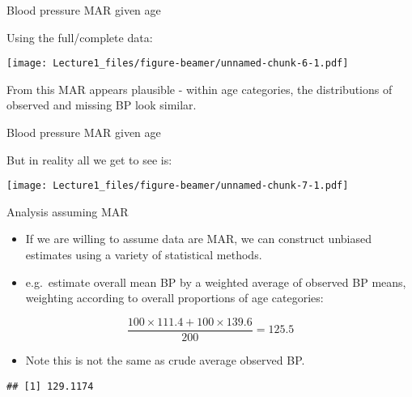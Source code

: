 \documentclass[ignorenonframetext,]{beamer}
\newenvironment{Shaded}{\begin{snugshade}}{\end{snugshade}}
\newcommand{\DataTypeTok}[1]{\textcolor[rgb]{0.13,0.29,0.53}{#1}}
\newcommand{\KeywordTok}[1]{\textcolor[rgb]{0.13,0.29,0.53}{\textbf{#1}}}
\newcommand{\NormalTok}[1]{#1}
\newcommand{\OperatorTok}[1]{\textcolor[rgb]{0.81,0.36,0.00}{\textbf{#1}}}
\newcommand{\OtherTok}[1]{\textcolor[rgb]{0.56,0.35,0.01}{#1}}
\providecommand{\tightlist}{%
  \setlength{\itemsep}{0pt}\setlength{\parskip}{0pt}}
\begin{document}
\begin{frame}{Blood pressure MAR given age}
\protect\hypertarget{blood-pressure-mar-given-age}{}

Using the full/complete data:

\texttt{[image: Lecture1\_files/figure-beamer/unnamed-chunk-6-1.pdf]}

From this MAR appears plausible - within age categories, the
distributions of observed and missing BP look similar.

\end{frame}

\begin{frame}{Blood pressure MAR given age}
\protect\hypertarget{blood-pressure-mar-given-age-1}{}

But in reality all we get to see is:

\texttt{[image: Lecture1\_files/figure-beamer/unnamed-chunk-7-1.pdf]}

\end{frame}

\begin{frame}[fragile]{Analysis assuming MAR}
\protect\hypertarget{analysis-assuming-mar}{}

\begin{itemize}
\tightlist
\item
  If we are willing to assume data are MAR, we can construct unbiased
  estimates using a variety of statistical methods.
\item
  e.g.~estimate overall mean BP by a weighted average of observed BP
  means, weighting according to overall proportions of age categories:
\end{itemize}

\[  \frac{100 \times 111.4 + 100 \times 139.6}{200} = 125.5  \]

\begin{itemize}
\tightlist
\item
  Note this is not the same as crude average observed BP.
\end{itemize}

\small

\begin{Shaded}
\end{Shaded}

\begin{verbatim}
## [1] 129.1174
\end{verbatim}

\normalsize

\end{frame}
\end{document}
